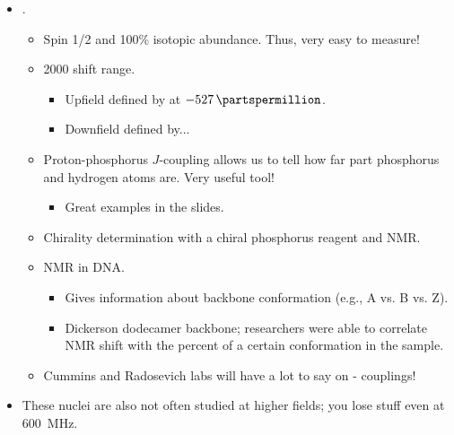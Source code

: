 \documentclass[../notes.tex]{subfiles}
\begin{document}
\begin{itemize}
\begin{itemize}
\begin{itemize}
        \end{itemize}
        \item {}.
        \begin{itemize}
            \item Spin 1/2 and 100\% isotopic abundance. Thus, very easy to measure!
            \item \SI{2000}{\partspermillion} shift range.
            \begin{itemize}
                \item Upfield defined by  at $-\SI{527}{\partspermillion}$.
                \item Downfield defined by...
            \end{itemize}
            \item Proton-phosphorus $J$-coupling allows us to tell how far part phosphorus and hydrogen atoms are. Very useful tool!
            \begin{itemize}
                \item Great examples in the slides.
            \end{itemize}
            \item Chirality determination with a chiral phosphorus reagent and  NMR.
            \item {} NMR in DNA.
            \begin{itemize}
                \item Gives information about backbone conformation (e.g., A vs. B vs. Z).
                \item Dickerson dodecamer backbone; researchers were able to correlate  NMR shift with the percent of a certain conformation in the sample.
            \end{itemize}
            \item Cummins and Radosevich labs will have a lot to say on - couplings!
        \end{itemize}
        \item These nuclei are also not often studied at higher fields; you lose stuff even at \SI{600}{\mega\hertz}.
    \end{itemize}
\end{itemize}
\end{document}
